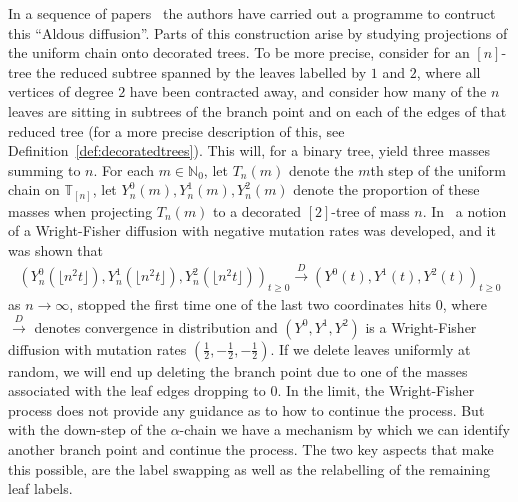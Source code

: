 \documentclass[a4paper, final]{amsart}
\theoremstyle{plain}
\theoremstyle{definition}
\newcommand{\T}{\mathbb{T}}
\newcommand{\dcon}{\xrightarrow{D}}
\newcommand{\N}{\mathbb{N}}
\begin{document}
In a sequence of papers~\cite{forman2019diffusions, RefWorks:doc:5b720899e4b0fd36f5bb93a6, RefWorks:doc:5b720899e4b0874a74e5a439, forman2018aldous} the authors have carried out a programme to contruct this “Aldous diffusion”.
Parts of this construction arise by studying projections of the uniform chain onto decorated trees.
To be more precise, consider for an $[n]$-tree the reduced subtree spanned by the leaves labelled by $1$ and $2$, where all vertices of degree $2$ have been contracted away, and consider how many of the $n$ leaves are sitting in subtrees of the branch point and on each of the edges of that reduced tree (for a more precise description of this, see Definition~\ref{def:decoratedtrees}).
This will, for a binary tree, yield three masses summing to $n$.
For each $m \in \N_0$, let $T_n(m)$ denote the $m$th step of the uniform chain on $\T_{[n]}$, let $Y_n^0(m), Y_n^1(m), Y_n^2(m)$ denote the proportion of these masses when projecting $T_n(m)$ to a decorated $[2]$-tree of mass $n$.
In~\cite{RefWorks:doc:5b4cbb92e4b0bc982fe42f3a} a notion of a Wright-Fisher diffusion with negative mutation rates was developed, and it was shown that
%
\begin{align}\label{eq:WrightFisher-diffusion}
  {\left( Y_n^0(\lfloor n^2 t \rfloor), Y_n^1(\lfloor n^2 t \rfloor ) , Y_n^2(\lfloor n^2 t \rfloor ) \right)}_{t \geq 0}
  \dcon
  {\left( Y^0(t), Y^1(t), Y^2(t) \right)}_{t \geq 0}
\end{align}
%
as $n \to \infty$, stopped the first time one of the last two coordinates hits 0, where $\dcon$ denotes convergence in distribution and $(Y^0, Y^1, Y^2)$ is a Wright-Fisher diffusion with mutation rates $\left( \frac{1}{2}, -\frac{1}{2}, -\frac{1}{2} \right)$.
If we delete leaves uniformly at random, we will end up deleting the branch point due to one of the masses associated with the leaf edges dropping to $0$.
In the limit, the Wright-Fisher process does not provide any guidance as to how to continue the process.
But with the down-step of the $\alpha$-chain we have a mechanism by which we can identify another branch point and continue the process.
The two key aspects that make this possible, are the label swapping as well as the relabelling of the remaining leaf labels.
\end{document}
